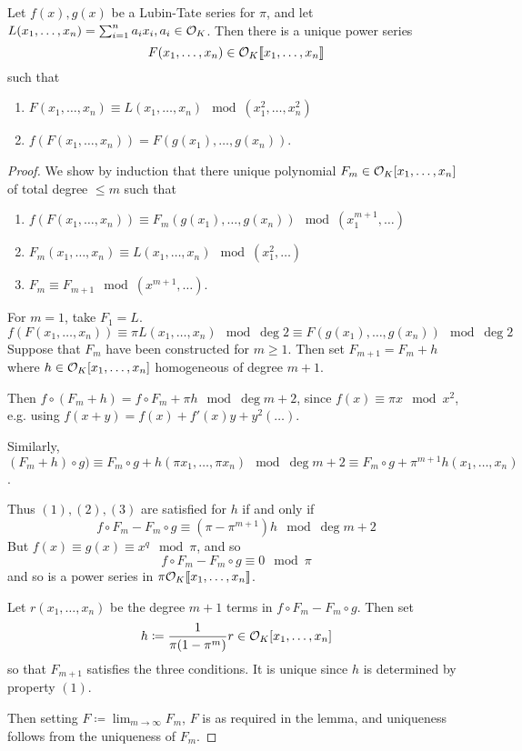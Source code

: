\documentclass[10pt,a4paper]{article}
\begin{document}
\begin{lemma}
  Let $f(x), g(x)$ be a Lubin-Tate series for $\pi$, and let $L(x_1, \ldots, x_n) = \sum_{i=1}^n a_i x_i, a_i \in \mathcal{O}_K$. Then there is a unique power series
  \[F(x_1, \ldots, x_n) \in \mathcal{O}_K\llbracket x_1, \ldots, x_n\rrbracket\]
  such that
  \begin{enumerate}
    \item $F(x_1, \ldots, x_n) \equiv L(x_1, \ldots, x_n) \mod (x_1^2, \ldots, x_n^2)$
    \item $f(F(x_1, \ldots, x_n)) = F(g(x_1), \ldots, g(x_n))$.
  \end{enumerate}
\end{lemma}
\begin{proof}
  We show by induction that there unique polynomial $F_m \in \mathcal{O}_K[x_1, \ldots, x_n]$ of total degree $\leq m$ such that
  \begin{enumerate}
    \item $f(F(x_1, \ldots, x_n))\equiv F_m(g(x_1), \ldots, g(x_n))\mod (x_1^{m+1},\ldots)$
    \item $F_m(x_1, \ldots, x_n) \equiv L(x_1, \ldots, x_n) \mod (x_1^2, \ldots)$
    \item $F_m \equiv F_{m+1} \mod (x^{m+1},\ldots)$.
  \end{enumerate}
  For $m=1$, take $F_1 = L$.
  \[f(F(x_1, \ldots, x_n)) \equiv \pi L(x_1, \ldots, x_n) \mod \deg 2 \equiv F(g(x_1), \ldots, g(x_n)) \mod \deg 2\]
  Suppose that $F_m$ have been constructed for $m \geq 1$. Then set $F_{m+1} = F_m+h$ where $h \in \mathcal{O}_K[x_1, \ldots, x_n]$ homogeneous of degree $m+1$.

  Then $f \circ (F_m + h) = f \circ F_m + \pi h \mod \deg m+2$, since $f(x) \equiv \pi x \mod x^2$, e.g. using $f(x+y) = f(x)+f'(x)y+y^2(\ldots)$.

  Similarly, $(F_m+h)\circ g) \equiv F_m \circ g + h(\pi x_1, \ldots, \pi x_n)\mod \deg m+2 \equiv F_m \circ g + \pi^{m+1}h(x_1, \ldots, x_n)$.

  Thus $(1),(2),(3)$ are satisfied for $h$ if and only if
  \[f\circ F_m - F_m \circ g \equiv (\pi-\pi^{m+1})h \mod \deg m+2\]
  But $f(x) \equiv g(x) \equiv x^q \mod \pi$, and so
  \[f \circ F_m - F_m \circ g \equiv 0 \mod \pi\]
  and so is a power series in $\pi \mathcal{O}_K\llbracket x_1, \ldots, x_n \rrbracket$.

  Let $r(x_1, \ldots, x_n)$ be the degree $m+1$ terms in $f \circ F_m - F_m \circ g$. Then set
  \[h \coloneqq \frac{1}{\pi(1-\pi^m)}r \in \mathcal{O}_K [x_1, \ldots, x_n]\]
  so that $F_{m+1}$ satisfies the three conditions. It is unique since $h$ is determined by property $(1)$.

  Then setting $F \coloneqq \lim_{m\to\infty} F_m$, $F$ is as required in the lemma, and uniqueness follows from the uniqueness of $F_m$.
\end{proof}
\end{document}
